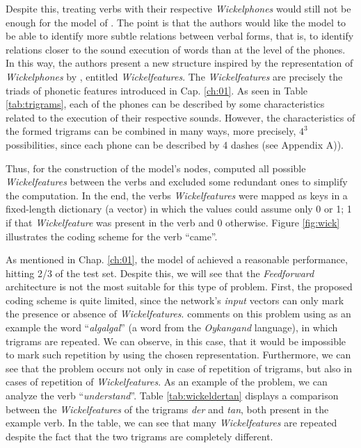 Despite this, treating verbs with their respective \textit{Wickelphones} would still not be enough for the model of \cite{rumelhart:1986}. The point is that the authors would like the model to be able to identify more subtle relations between verbal forms, that is, to identify relations closer to the sound execution of words than at the level of the phones. In this way, the authors present a new structure inspired by the representation of \textit{Wickelphones} by \cite{wickelgren:1969}, entitled \textit{Wickelfeatures}. The \textit{Wickelfeatures} are precisely the triads of phonetic features introduced in Cap. \ref{ch:01}. As seen in Table \ref{tab:trigrams}, each of the phones can be described by some characteristics related to the execution of their respective sounds. However, the characteristics of the formed trigrams can be combined in many ways, more precisely, $4^{3}$ possibilities, since each phone can be described by 4 dashes (see Appendix A)).

Thus, for the construction of the model's nodes, \cite{rumelhart:1986} computed all possible \textit{Wickelfeatures} between the verbs and excluded some redundant ones to simplify the computation. In the end, the verbs \textit{Wickelfeatures} were mapped as keys in a fixed-length dictionary (a vector) in which the values could assume only 0 or 1; 1 if that \textit{Wickelfeature} was present in the verb and 0 otherwise. Figure \ref{fig:wick} illustrates the coding scheme for the verb “came”.



As mentioned in Chap. \ref{ch:01}, the model of \cite{rumelhart:1986} achieved a reasonable performance, hitting 2/3 of the test set. Despite this, we will see that the \textit{Feedforward} architecture is not the most suitable for this type of problem. First, the proposed coding scheme is quite limited, since the network's \textit{input} vectors can only mark the presence or absence of \textit{Wickelfeatures}. \cite{Pinker:1999} comments on this problem using as an example the word “\textit{algalgal}” (a word from the \textit{Oykangand} language), in which trigrams are repeated. We can observe, in this case, that it would be impossible to mark such repetition by using the chosen representation. Furthermore, we can see that the problem occurs not only in case of repetition of trigrams, but also in cases of repetition of \textit{Wickelfeatures}. As an example of the problem, we can analyze the verb “\textit{understand}”. Table \ref{tab:wickeldertan} displays a comparison between the \textit{Wickelfeatures} of the trigrams \textit{der} and \textit{tan}, both present in the example verb. In the table, we can see that many \textit{Wickelfeatures} are repeated despite the fact that the two trigrams are completely different.

